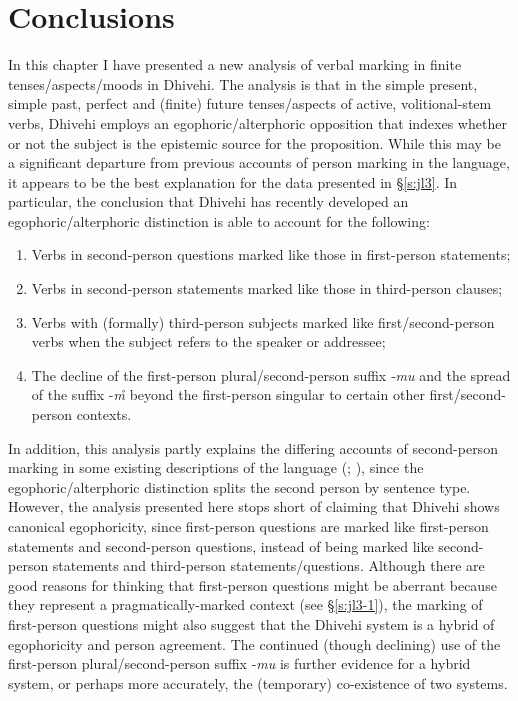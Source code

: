\documentclass[output=paper]{langsci/langscibook}
\begin{document}
\section{Conclusions}\label{s:jl5}

In this chapter I have presented a new analysis of verbal marking in finite tenses/aspects/moods in Dhivehi. The analysis is that in the simple present, simple past, perfect and (finite) future tenses/aspects of active, volitional-stem verbs, Dhivehi employs an egophoric/alterphoric opposition that indexes whether or not the subject is the epistemic source for the proposition. While this may be a significant departure from previous accounts of person marking in the language, it appears to be the best explanation for the data presented in §\ref{s:jl3}. In particular, the conclusion that Dhivehi has recently developed an egophoric/alterphoric distinction is able to account for the following:

\begin{enumerate}[label=\roman*.]
	\item Verbs in second-person questions marked like those in first-person statements; 
	\item Verbs in second-person statements marked like those in third-person clauses;
	\item Verbs with (formally) third-person subjects marked like first/second-person verbs when the subject refers to the speaker or addressee;
	\item The decline of the first-person plural/second-person suffix ‑\textit{mu} and the spread of the suffix -\textit{m̊} beyond the first-person singular to certain other first/second-person contexts.
\end{enumerate}

In addition, this analysis partly explains the differing accounts of second-person marking in some existing descriptions of the language (\citealt{CainGair2000}; \citealt{Fritz2002}), since the egophoric/alterphoric distinction splits the second person by sentence type. However, the analysis presented here stops short of claiming that Dhivehi shows canonical egophoricity, since first-person questions are marked like first-person statements and second-person questions, instead of being marked like second-person statements and third-person statements/questions. Although there are good reasons for thinking that first-person questions might be aberrant because they represent a pragmatically-marked context (see §‎\ref{s:jl3-1}), the marking of first-person questions might also suggest that the Dhivehi system is a hybrid of egophoricity and person agreement. The continued (though declining) use of the first-person plural/second-person suffix ‑\textit{mu} is further evidence for a hybrid system, or perhaps more accurately, the (temporary) co-existence of two systems.
\end{document}
